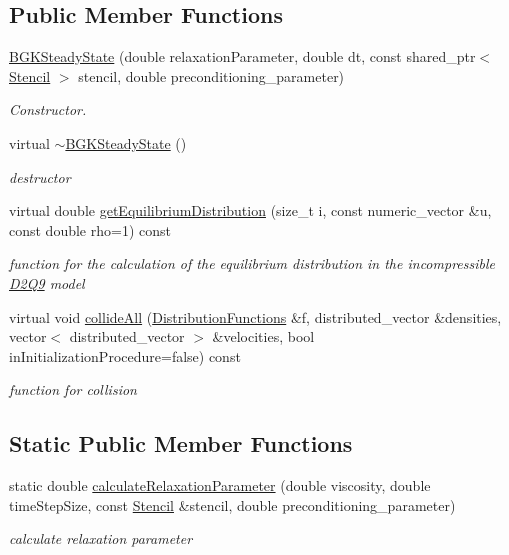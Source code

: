 \subsection*{Public Member Functions}
\begin{DoxyCompactItemize}
\item 
\hyperlink{classnatrium_1_1BGKSteadyState_aa8521523f8603fdc5a391d6e6388667c}{BGKSteadyState} (double relaxationParameter, double dt, const shared\_\-ptr$<$ \hyperlink{classnatrium_1_1Stencil}{Stencil} $>$ stencil, double preconditioning\_\-parameter)
\begin{DoxyCompactList}\small\item\em Constructor. \item\end{DoxyCompactList}\item 
virtual \hyperlink{classnatrium_1_1BGKSteadyState_ab2c58f1d6b964179a2abeb5f54aa5edc}{$\sim$BGKSteadyState} ()
\begin{DoxyCompactList}\small\item\em destructor \item\end{DoxyCompactList}\item 
virtual double \hyperlink{classnatrium_1_1BGKSteadyState_ad99d9159cc14b5897bea7f145c3b39ca}{getEquilibriumDistribution} (size\_\-t i, const numeric\_\-vector \&u, const double rho=1) const 
\begin{DoxyCompactList}\small\item\em function for the calculation of the equilibrium distribution in the incompressible \hyperlink{classnatrium_1_1D2Q9}{D2Q9} model \item\end{DoxyCompactList}\item 
virtual void \hyperlink{classnatrium_1_1BGKSteadyState_a21eda1096ed5c75672b338a75f49d2cc}{collideAll} (\hyperlink{classnatrium_1_1DistributionFunctions}{DistributionFunctions} \&f, distributed\_\-vector \&densities, vector$<$ distributed\_\-vector $>$ \&velocities, bool inInitializationProcedure=false) const 
\begin{DoxyCompactList}\small\item\em function for collision \item\end{DoxyCompactList}\end{DoxyCompactItemize}
\subsection*{Static Public Member Functions}
\begin{DoxyCompactItemize}
\item 
static double \hyperlink{classnatrium_1_1BGKSteadyState_a2cd6628c71475663e204656147de99b8}{calculateRelaxationParameter} (double viscosity, double timeStepSize, const \hyperlink{classnatrium_1_1Stencil}{Stencil} \&stencil, double preconditioning\_\-parameter)
\begin{DoxyCompactList}\small\item\em calculate relaxation parameter \item\end{DoxyCompactList}\end{DoxyCompactItemize}


